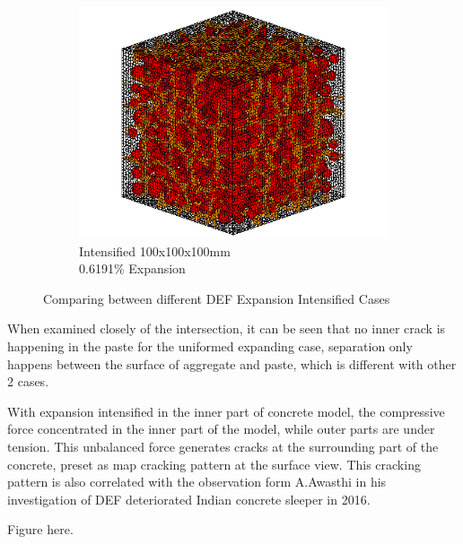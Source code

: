 \begin{figure}[ht!]
\begin{subfigure}{.3\textwidth}
      \includegraphics[width=.9\linewidth]{Files/exp_3D/DEF/A30X-1C_3_c.png}
    \caption{Intensified 100x100x100mm \\  0.6191\% Expansion}
    \end{subfigure}%

  \caption{Comparing between different DEF Expansion Intensified Cases}
  \label{fig:DEF_X_compare}
\end{figure}


When examined closely of the intersection, it can be seen that no inner crack is happening in the paste for the uniformed expanding case, separation only happens between the surface of aggregate and paste, which is different with other 2 cases.

With expansion intensified in the inner part of concrete model, the compressive force concentrated in the inner part of the model, while outer parts are under tension. This unbalanced force generates cracks at the surrounding part of the concrete, preset as map cracking pattern at the surface view. This cracking pattern is also correlated with the observation form A.Awasthi in his investigation of DEF deteriorated  Indian concrete sleeper in 2016.

Figure here.

